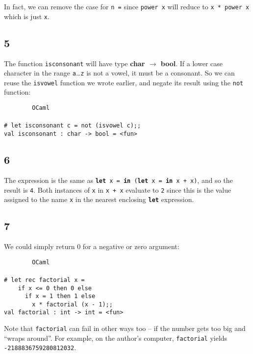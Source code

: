 \documentclass[]{book}
\newcommand\upquote[1]{\textquotesingle#1\textquotesingle}
\newcommand{\smspace}{\vspace{4mm}}
\begin{document}
\noindent In fact, we can remove the case for \texttt{n\! =} since \texttt{power\! x} will reduce to \texttt{x\! *\! power\! x} which is just \texttt{x}.

\subsection*{5}
The function \texttt{isconsonant} will have type \textbf{\textsf{char $\rightarrow$ bool}}. If a lower case character in the range \texttt{\upquote{a}}\ldots\texttt{\upquote{z}} is not a vowel, it must be a consonant. So we can reuse the \texttt{isvowel} function we wrote earlier, and negate its result using the \texttt{not} function:

\smspace
\noindent\verb!        OCaml!\\
\noindent\\
\noindent\verb!# let isconsonant c = not (isvowel c);;!\\
\noindent\verb!val isconsonant : char -> bool = <fun>!

\subsection*{6}
The expression is the same as \texttt{\textbf{let}\! x\! =\! \textbf{in}\! (\textbf{let}\! x\! =\! \textbf{in}\! x\! +\! x)}, and so the result is \texttt{4}. Both instances of \texttt{x} in \texttt{x\! +\! x} evaluate to \texttt{2} since this is the value assigned to the name \texttt{x} in the nearest enclosing \texttt{\textbf{let}} expression.

\subsection*{7}
We could simply return $0$ for a negative or zero argument:

\smspace
\noindent\verb!        OCaml!\\
\noindent\\
\noindent\verb!# let rec factorial x =!\\
\noindent\verb!    if x <= 0 then 0 else!\\
\noindent\verb!      if x = 1 then 1 else!\\
\noindent\verb!        x * factorial (x - 1);;!\\
\noindent\verb!val factorial : int -> int = <fun>!
\smspace

\noindent Note that \texttt{factorial} can fail in other ways too -- if the number gets too big and ``wraps around''. For example, on the author's computer, \texttt{factorial\!} yields \texttt{-2188836759280812032}.
\end{document}

